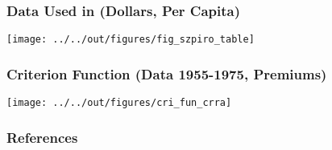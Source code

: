 \documentclass[11pt]{beamer}
\begin{document}
\begin{frame}
    \frametitle{Data Used in \citet{szpiro1986measuring} (Dollars, Per Capita)}
    \texttt{[image: ../../out/figures/fig\_szpiro\_table]}

\end{frame}

\begin{frame}
    \frametitle{Criterion Function (Data 1955-1975, Premiums)}
    \texttt{[image: ../../out/figures/cri\_fun\_crra]}

\end{frame}

\begin{frame}[allowframebreaks]
    \frametitle{References}
    
    \renewcommand{\bibfont}{\normalfont\footnotesize}
    \printbibliography
    
    
\end{frame}
\end{document}
